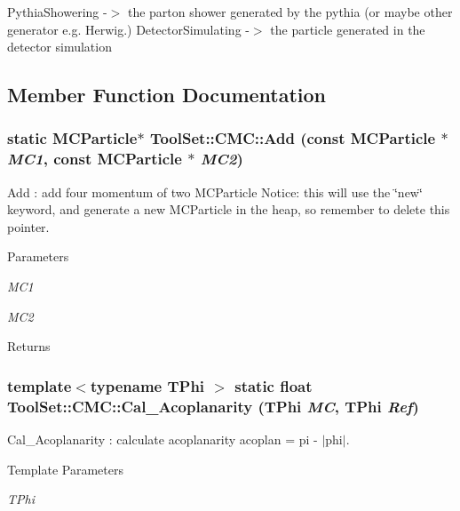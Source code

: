 PythiaShowering -\/$>$ the parton shower generated by the pythia (or maybe other generator e.g. Herwig.) DetectorSimulating -\/$>$ the particle generated in the detector simulation 

\subsection{Member Function Documentation}
\hypertarget{classToolSet_1_1CMC_ad1b2172aaacc40d4f5971492a5d1a0f5}{
\subsubsection[{Add}]{\setlength{\rightskip}{0pt plus 5cm}static MCParticle$\ast$ ToolSet::CMC::Add (const MCParticle $\ast$ {\em MC1}, \/  const MCParticle $\ast$ {\em MC2})}}
\label{classToolSet_1_1CMC_ad1b2172aaacc40d4f5971492a5d1a0f5}


Add : add four momentum of two MCParticle Notice: this will use the \char`\"{}new\char`\"{} keyword, and generate a new MCParticle in the heap, so remember to delete this pointer. 
\begin{DoxyParams}{Parameters}
\item[{\em MC1}]\item[{\em MC2}]\end{DoxyParams}
\begin{DoxyReturn}{Returns}

\end{DoxyReturn}
\hypertarget{classToolSet_1_1CMC_aa1667ca515e4b26ca43755fd8d2e30bd}{
\subsubsection[{Cal\_\-Acoplanarity}]{\setlength{\rightskip}{0pt plus 5cm}template$<$typename TPhi $>$ static float ToolSet::CMC::Cal\_\-Acoplanarity (TPhi {\em MC}, \/  TPhi {\em Ref})}}
\label{classToolSet_1_1CMC_aa1667ca515e4b26ca43755fd8d2e30bd}


Cal\_\-Acoplanarity : calculate acoplanarity acoplan = pi -\/ $|$phi$|$. 
\begin{DoxyTemplParams}{Template Parameters}
\item[{\em TPhi}]\end{DoxyTemplParams}

